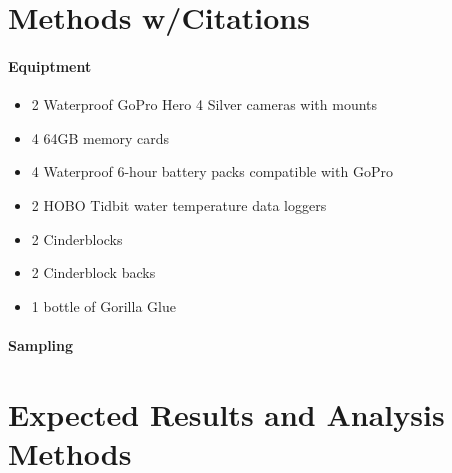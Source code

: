 \documentclass{tufte-handout}
\begin{document}
 

\section{Methods w/Citations}

\paragraph{Equiptment}  \begin{itemize}
\item 2 Waterproof GoPro Hero 4 Silver cameras with mounts
\item 4 64GB memory cards
\item 4 Waterproof 6-hour battery packs compatible with GoPro
\item 2 HOBO Tidbit water temperature data loggers
\item 2 Cinderblocks
\item 2 Cinderblock backs
\item 1 bottle of Gorilla Glue
\end{itemize}

\paragraph{Sampling}


\section{Expected Results and Analysis Methods}
\end{document}
